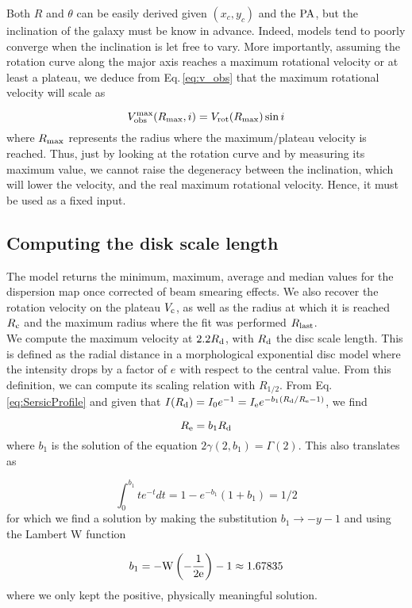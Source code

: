 Both $R$ and $\theta$  can be easily derived given $(x_c , y_c)$ and the $\rm{PA}$, but the inclination of the galaxy must be know in advance. Indeed, models tend to poorly converge when the inclination is let free to vary. More importantly, assuming the rotation curve along the major axis reaches a maximum rotational velocity or at least a plateau, we deduce from Eq.\,\ref{eq:v_obs} that the maximum rotational velocity will scale as

\begin{equation}
	V_{\rm{obs}}^{\rm{max}} (R_{\rm{max}}, i) = V_{\rm{rot}} (R_{\rm{max}}) \sin i
	\label{eq:V_obs_max}
\end{equation}
where $R_{\rm{max}}$ represents the radius where the maximum/plateau velocity is reached. Thus, just by looking at the rotation curve and by measuring its maximum value, we cannot raise the degeneracy between the inclination, which will lower the velocity, and the real maximum rotational velocity. Hence, it must be used as a fixed input.

\subsection{Computing the disk scale length}
\label{sec:disk_scale_length}

The model returns the minimum, maximum, average and median values for the dispersion map once corrected of beam smearing effects. We also recover the rotation velocity on the plateau $V_{\rm{c}}$, as well as the radius at which it is reached $R_{\rm{c}}$ and the maximum radius where the fit was performed $R_{\rm{last}}$.\\

We compute the maximum velocity at $2.2 R_{\rm{d}}$, with $R_{\rm{d}}$ the disc scale length. This is defined as the radial distance in a morphological exponential disc model where the intensity drops by a factor of $e$ with respect to the central value. From this definition, we can compute its scaling relation with $R_{1/2}$. From Eq.\,\ref{eq:SersicProfile} and given that $I(R_{\rm{d}}) = I_0 e^{-1} = I_{\rm{e}} e^{- b_1 ( R_{\rm{d}} / R_{\rm{e}} - 1 )}$, we find

\begin{equation}
	R_{\rm{e}} = b_1 R_{\rm{d}}
\end{equation}
where $b_1$ is the solution of the equation $2 \gamma (2, b_1) = \Gamma(2)$. This also translates as

\begin{equation}
	\int_0^{b_1} t e^{-t} dt = 1 - e^{-b_1} ( 1 + b_1) = 1/2
\end{equation}
for which we find a solution by making the substitution $b_1 \rightarrow - y - 1$ and using the Lambert W function

\begin{equation}
	b_1 = - \rm{W} \left ( - \frac{1}{2 e} \right ) - 1 \approx 1.67835
\end{equation}
where we only kept the positive, physically meaningful solution. 